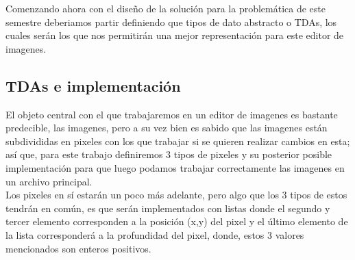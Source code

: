 Comenzando ahora con el diseño de la solución para la problemática de este semestre
 deberiamos partir definiendo que tipos de dato abstracto o TDAs, los cuales serán los que 
 nos permitirán una mejor representación para este editor de imagenes.

 \subsection{TDAs e implementación}
 El objeto central con el que trabajaremos en un editor de imagenes es bastante predecible, 
 las imagenes, pero a su vez bien es sabido que las imagenes están subdivididas en 
  pixeles con los que trabajar si se quieren realizar cambios en esta; así que, para este trabajo definiremos 3 tipos de pixeles
   y su posterior posible implementación para que luego podamos trabajar correctamente las imagenes en un archivo principal.\\

Los pixeles en sí estarán un poco más adelante, pero algo que los 3 tipos de estos tendrán en común, es que serán implementados con listas 
donde el segundo y tercer elemento corresponden a la posición (x,y) del pixel y el último elemento de la lista
 corresponderá a la profundidad del pixel, donde, estos 3 valores mencionados son enteros positivos.\\

